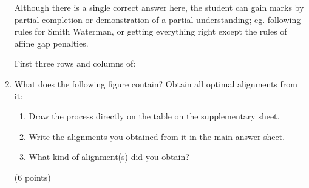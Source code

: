 \documentclass[11pt]{article}
\begin{document}
\begin{enumerate}
\begin{Notes}
  Although there is a single correct answer here, the student can gain marks
  by partial completion or demonstration of a partial understanding;
  eg. following rules for Smith Waterman, or getting everything right except
  the rules of affine gap penalties.
  
  First three rows and columns of:\\
  \begin{figure}[H]
    \begin{tikzpicture}[scale=0.6]
      
    \end{tikzpicture}
  \end{figure}
\end{Notes}

\item What does the following figure contain? Obtain all optimal alignments
  from it:
  \begin{figure}[H]
    \begin{tikzpicture}[scale=0.6]
      
    \end{tikzpicture}
  \end{figure}
  \begin{enumerate}
  \item Draw the process directly on the table on the supplementary sheet.
  \item Write the alignments you obtained from it in the main answer sheet.
  \item What kind of alignment(s) did you obtain?
  \end{enumerate}
  (6 points)

\begin{Notes}
  \begin{figure}[H]
    \begin{tikzpicture}[scale=0.6]
      
    \end{tikzpicture}
  \end{figure}
\end{Notes}


\end{enumerate}
\end{document}
